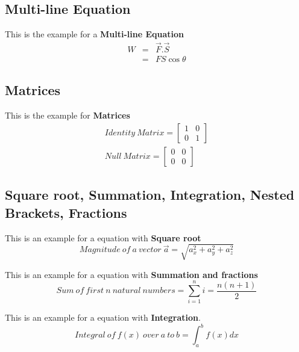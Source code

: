 \documentclass{article}
\begin{document}
\subsection{Multi-line Equation}
This is the example for a \textbf{\textcolor{RoyalPurple}{Multi-line Equation}}  
\begin{eqnarray}
    W &=& \Vec{F}.\Vec{S} \nonumber\\
      &=& FS\cos\theta \nonumber
\end{eqnarray}

\subsection{Matrices}
This is the example for \textbf{\textcolor{RoyalPurple}{Matrices}}
\begin{eqnarray}
Identity \ Matrix = 
   \begin{bmatrix}
    1 & 0 \\
    0 & 1 
    \end{bmatrix} \nonumber\\
Null \ Matrix = 
    \begin{bmatrix}
    0 & 0 \\
    0 & 0 
    \end{bmatrix} \nonumber
\end{eqnarray}

\subsection{Square root, Summation, Integration, Nested Brackets, Fractions}

This is an example for a equation with \textbf{\textcolor{RoyalPurple}{Square root}}
\begin{equation}
 Magnitude \ of \  a \ vector \ \Vec{a} = \sqrt{a_x^2 + a_y^2 + a_z^2 }  \nonumber 
\end{equation}

This is an example for a equation with \textbf{\textcolor{RoyalPurple}{Summation and fractions}}
\begin{equation}
 Sum \ of \  first \ n \ natural \ numbers = \sum_{i=1}^n i = \frac{n(n+1)}{2} \nonumber 
\end{equation}

This is an example for a equation with \textbf{\textcolor{RoyalPurple}{Integration}}.
\begin{equation}
 Integral \ of \  f(x) \ over \ a \ to\ b = \int_{a}^b f(x)dx \nonumber  \nonumber 
\end{equation}
\end{document}
